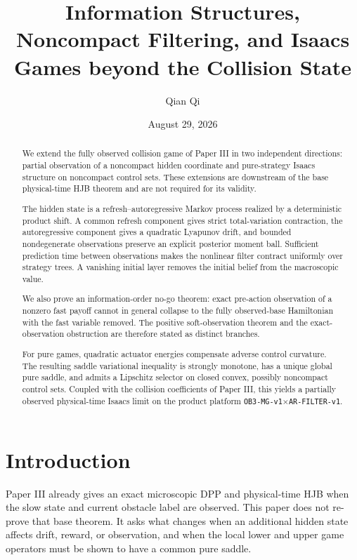\documentclass[11pt,reqno]{amsart}
\title[Filtering and Isaacs extensions]{Information Structures, Noncompact Filtering, and Isaacs Games beyond the Collision State}
\author{Qian Qi}
\date{August 29, 2026}
\theoremstyle{definition}
\theoremstyle{remark}
\begin{document}
\begin{abstract}
We extend the fully observed collision game of Paper III in two independent
directions: partial observation of a noncompact hidden coordinate and
pure-strategy Isaacs structure on noncompact control sets.  These extensions
are downstream of the base physical-time HJB theorem and are not required for
its validity.

The hidden state is a refresh--autoregressive Markov process realized by a
deterministic product shift.  A common refresh component gives strict
total-variation contraction, the autoregressive component gives a quadratic
Lyapunov drift, and bounded nondegenerate observations preserve an explicit
posterior moment ball.  Sufficient prediction time between observations makes
the nonlinear filter contract uniformly over strategy trees.  A vanishing
initial layer removes the initial belief from the macroscopic value.

We also prove an information-order no-go theorem: exact pre-action observation
of a nonzero fast payoff cannot in general collapse to the fully observed-base
Hamiltonian with the fast variable removed.  The positive soft-observation
theorem and the exact-observation obstruction are therefore stated as distinct
branches.

For pure games, quadratic actuator energies compensate adverse control
curvature.  The resulting saddle variational inequality is strongly monotone,
has a unique global pure saddle, and admits a Lipschitz selector on closed
convex, possibly noncompact control sets.  Coupled with the collision
coefficients of Paper III, this yields a partially observed physical-time
Isaacs limit on the product platform
\texttt{OB3-MG-v1}$\times$\texttt{AR-FILTER-v1}.
\end{abstract}

\maketitle
\tableofcontents

\section{Introduction}

Paper III already gives an exact microscopic DPP and physical-time HJB when
the slow state and current obstacle label are observed.  This paper does not
re-prove that base theorem.  It asks what changes when an additional hidden
state affects drift, reward, or observation, and when the local lower and
upper game operators must be shown to have a common pure saddle.
\end{document}
